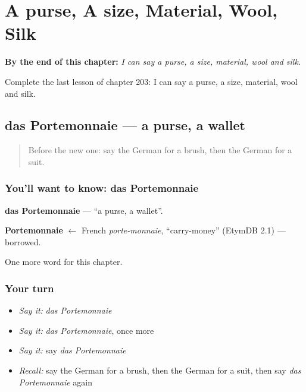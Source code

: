 
\chapter{A purse, A size, Material, Wool, Silk}
\label{ch:ge-a-purse-a-size-material-wool-silk}

\begin{chapteropening}
\textbf{By the end of this chapter:} \emph{I can say a purse, a size, material, wool and silk.}

Complete the last lesson of chapter 203: I can say a purse, a size, material, wool and silk.
\end{chapteropening}

\section[das Portemonnaie]{das Portemonnaie — a purse, a wallet}

\label{lesson:GE-C203-portemonnaie}



\begin{quote}
Before the new one: say the German for a brush, then the German for a suit.
\end{quote}

\subsection*{You'll want to know: das Portemonnaie}
\textbf{das Portemonnaie} — \textquotedblleft{}a purse, a wallet\textquotedblright{}.

\begin{cousinweb}
\textbf{Portemonnaie} $\leftarrow$ French \emph{porte-monnaie}, \textquotedblleft{}carry-money\textquotedblright{} (EtymDB 2.1) — borrowed.
\end{cousinweb}

\begin{grammarlens}[title={What you've built}]
One more word for this chapter.
\end{grammarlens}

\subsection*{Your turn}
\begin{itemize}
\raggedright
  \item \emph{Say it:} \emph{das Portemonnaie}
  \item \emph{Say it:} \emph{das Portemonnaie}, once more
  \item \emph{Say it:} say \emph{das Portemonnaie}
  \item \emph{Recall:} say the German for a brush, then the German for a suit, then say \emph{das Portemonnaie} again
\end{itemize}

